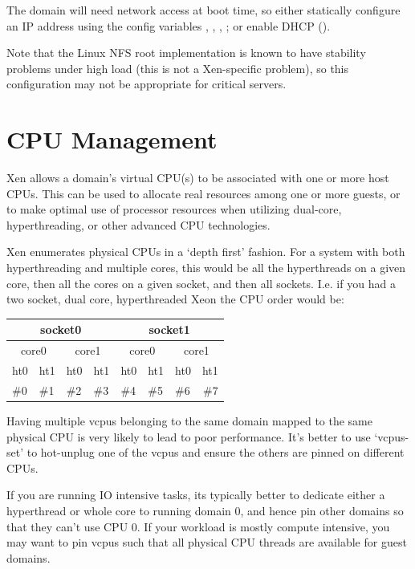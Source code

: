 \documentclass[11pt,twoside,final,openright]{report}
\begin{document}
The domain will need network access at boot time, so either statically
configure an IP address using the config variables ,
, , ; or enable DHCP
().

Note that the Linux NFS root implementation is known to have stability
problems under high load (this is not a Xen-specific problem), so this
configuration may not be appropriate for critical servers.


\chapter{CPU Management}


Xen allows a domain's virtual CPU(s) to be associated with one or more
host CPUs.  This can be used to allocate real resources among one or
more guests, or to make optimal use of processor resources when
utilizing dual-core, hyperthreading, or other advanced CPU technologies.

Xen enumerates physical CPUs in a `depth first' fashion.  For a system
with both hyperthreading and multiple cores, this would be all the
hyperthreads on a given core, then all the cores on a given socket,
and then all sockets.  I.e.  if you had a two socket, dual core,
hyperthreaded Xeon the CPU order would be:


\begin{center}
\begin{tabular}{l|l|l|l|l|l|l|r}
\multicolumn{4}{c|}{socket0}     &  \multicolumn{4}{c}{socket1} \\ \hline
\multicolumn{2}{c|}{core0}  &  \multicolumn{2}{c|}{core1}  &
\multicolumn{2}{c|}{core0}  &  \multicolumn{2}{c}{core1} \\ \hline
ht0 & ht1 & ht0 & ht1 & ht0 & ht1 & ht0 & ht1 \\
\#0 & \#1 & \#2 & \#3 & \#4 & \#5 & \#6 & \#7 \\
\end{tabular}
\end{center}


Having multiple vcpus belonging to the same domain mapped to the same
physical CPU is very likely to lead to poor performance. It's better to
use `vcpus-set' to hot-unplug one of the vcpus and ensure the others are
pinned on different CPUs.

If you are running IO intensive tasks, its typically better to dedicate
either a hyperthread or whole core to running domain 0, and hence pin
other domains so that they can't use CPU 0. If your workload is mostly
compute intensive, you may want to pin vcpus such that all physical CPU
threads are available for guest domains.
\end{document}
